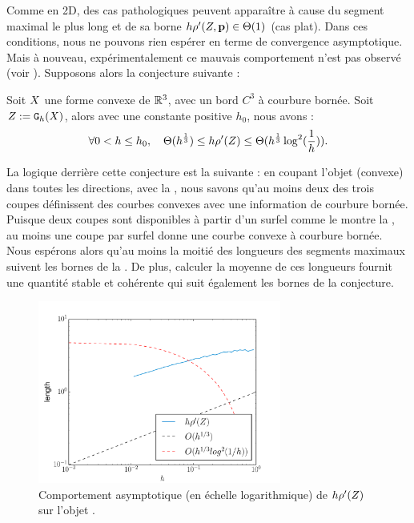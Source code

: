 %
Comme en 2D, des cas pathologiques peuvent apparaître à cause du segment maximal
le plus long et de sa borne $h\rho'(Z, \mathbf{p}) \in \Theta(1)$ (cas plat).
Dans ces conditions, nous ne pouvons rien espérer en terme de convergence
asymptotique. Mais à nouveau, expérimentalement ce mauvais comportement n'est
pas observé (voir ).
%
Supposons alors la conjecture suivante :
%
\begin{conjecture}
\label{conj:slice-mdss-3d}
  Soit $X$ une forme convexe de $\mathbb{R}^3$, avec un bord $C^3$ à courbure
  bornée. Soit $Z := \mathtt{G}_{h}(X)$, alors avec une constante positive $h_0$,
  nous avons :
  \begin{equation}
    \forall 0 < h \le h_0,\quad \Theta(h^{\frac{1}{3}}) \le h\rho'(Z) \le \Theta(h^{\frac{1}{3}} \log^2 (\frac{1}{h})) .
  \end{equation}
\end{conjecture}
%
La logique derrière cette conjecture est la suivante : en coupant l'objet (convexe) dans
toutes les directions, avec la , nous savons
qu'au moins deux des trois coupes définissent des courbes convexes avec une
information de courbure bornée. Puisque deux coupes sont disponibles à partir
d'un surfel comme le montre la , au moins une coupe
par surfel donne une courbe convexe à courbure bornée. Nous espérons alors qu'au
moins la moitié des longueurs des segments maximaux suivent les bornes de la
. De plus, calculer la moyenne de ces
longueurs fournit une quantité stable et cohérente qui suit également les bornes
de la conjecture.
\begin{figure}[ht]{
  \begin{center}
    \includegraphics[height=6cm]{images/Curvature/Ellipsoid_Radius}
  \end{center}}
    \caption{Comportement asymptotique (en échelle logarithmique) de $h\rho'( Z )$ sur l'objet \Ellipsoid.
    \label{fig:bounds-length-MDSS-fig}}
\end{figure}

